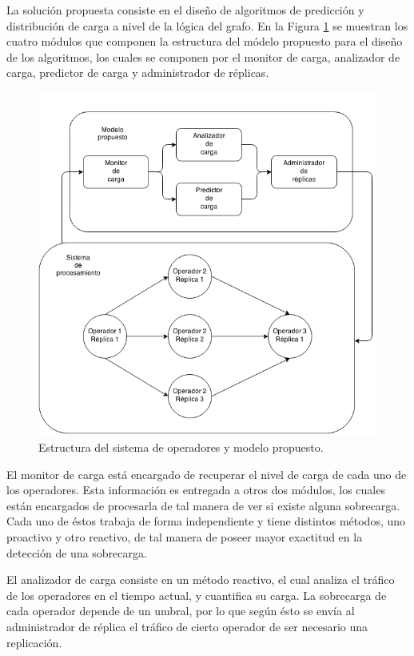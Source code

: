 \documentclass[12pt,letterpaper]{article}
\begin{document}
La solución propuesta consiste en el dise\~no de algoritmos de predicci\'on y distribuci\'on de carga a nivel de la l\'ogica del grafo. En la Figura \ref{fig:opt} se muestran los cuatro módulos que componen la estructura del m\'odelo propuesto para el dise\~no de los algoritmos, los cuales se componen por el monitor de carga, analizador de carga, predictor de carga y administrador de réplicas.

\begin{figure}[ht!]
  \centering
    \includegraphics[scale=0.5]{images/Diagrama.png}
  \caption{Estructura del sistema de operadores y modelo propuesto.}
  \label{fig:opt}
\end{figure}

El monitor de carga está encargado de recuperar el nivel de carga de cada uno de los operadores. Esta información es entregada a otros dos módulos, los cuales están encargados de procesarla de tal manera de ver si existe alguna sobrecarga. Cada uno de éstos trabaja de forma independiente y tiene distintos métodos, uno proactivo y otro reactivo, de tal manera de poseer mayor exactitud en la detección de una sobrecarga.

El analizador de carga consiste en un método reactivo, el cual analiza el tráfico de los operadores en el tiempo actual, y cuantifica su carga. La sobrecarga de cada operador depende de un umbral, por lo que según ésto se envía al administrador de réplica el tráfico de cierto operador de ser necesario una replicación.
\end{document}

